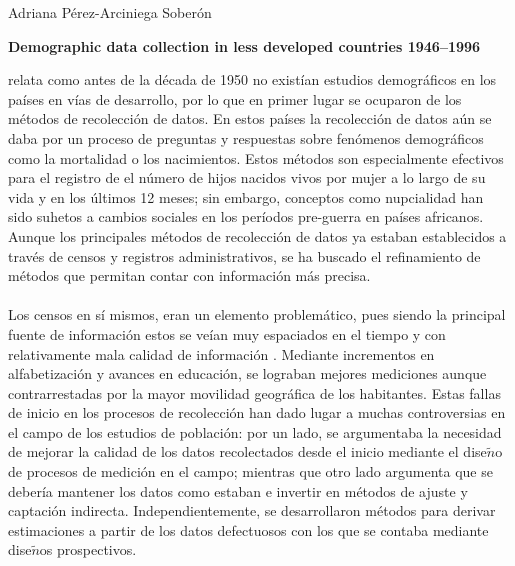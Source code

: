 \documentclass[11pt,spanish,letterpaper]{article}
\theoremstyle{plain}
\begin{document}
\begin{flushleft}
Adriana P\'erez-Arciniega Sober\'on
\end{flushleft}
\begin{center}
\textbf{Demographic data collection in less developed countries 1946--1996}
\end{center}
\cite{cleland1996demographic} relata como antes de la d\'ecada de 1950 no exist\'ian estudios demogr\'aficos en los pa\'ises en v\'ias de desarrollo, por lo que en primer lugar se ocuparon de los m\'etodos de recolecci\'on de datos. En estos pa\'ises la recolecci\'on de datos a\'un se daba por un proceso de preguntas y respuestas sobre fen\'omenos demogr\'aficos como la mortalidad o los nacimientos. Estos m\'etodos son especialmente efectivos para el registro de el n\'umero de hijos nacidos vivos por mujer a lo largo de su vida y en los \'ultimos 12 meses; sin embargo, conceptos como nupcialidad han sido suhetos a cambios sociales en los per\'iodos pre-guerra en pa\'ises africanos. Aunque los principales m\'etodos de recolecci\'on de datos ya estaban establecidos a trav\'es de censos y registros administrativos, se ha buscado el refinamiento de m\'etodos que permitan contar  con informaci\'on m\'as precisa.\\
\\
Los censos en s\'i mismos, eran un elemento problem\'atico, pues siendo la principal fuente de informaci\'on estos se ve\'ian muy espaciados en el tiempo y con relativamente mala calidad de informaci\'on . Mediante incrementos en alfabetizaci\'on y avances en educaci\'on, se lograban mejores mediciones aunque contrarrestadas por la mayor movilidad geogr\'afica de los habitantes. Estas fallas de inicio en los procesos de recolecci\'on han dado lugar a muchas controversias en el campo de los estudios de poblaci\'on: por un lado, se argumentaba la necesidad de mejorar la calidad de los datos recolectados desde el inicio mediante el dise$\tilde{n}$o de procesos de medici\'on en el campo; mientras que otro lado argumenta que se deber\'ia mantener los datos como estaban e invertir en m\'etodos de ajuste y captaci\'on indirecta. Independientemente, se desarrollaron m\'etodos para derivar estimaciones a partir de los datos defectuosos con los que se contaba mediante dise$\tilde{n}$os prospectivos.\\
\\
\end{document}
